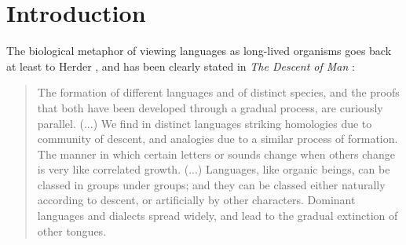 \documentclass[10pt]{article}
\begin{document}
\section*{Introduction}

The biological metaphor of viewing languages as long-lived organisms
goes back at least to Herder \cite{Morpurgo-Davies:1992},  and has been 
clearly stated in {\it The Descent of Man} \cite{Darwin:1871}:

\begin{quote}

The formation of different languages and of distinct species, and
the proofs that both have been developed through a gradual process,
are curiously parallel. (...) We find in
distinct languages striking homologies due to community of descent,
and analogies due to a similar process of formation. The manner in
which certain letters or sounds change when others change is very like
correlated growth. (...) Languages, like organic beings, can
be classed in groups under groups; and they can be classed either
naturally according to descent, or artificially by other characters.
Dominant languages and dialects spread widely, and lead to the gradual
extinction of other tongues. 

\end{quote} 
 
\end{document}
